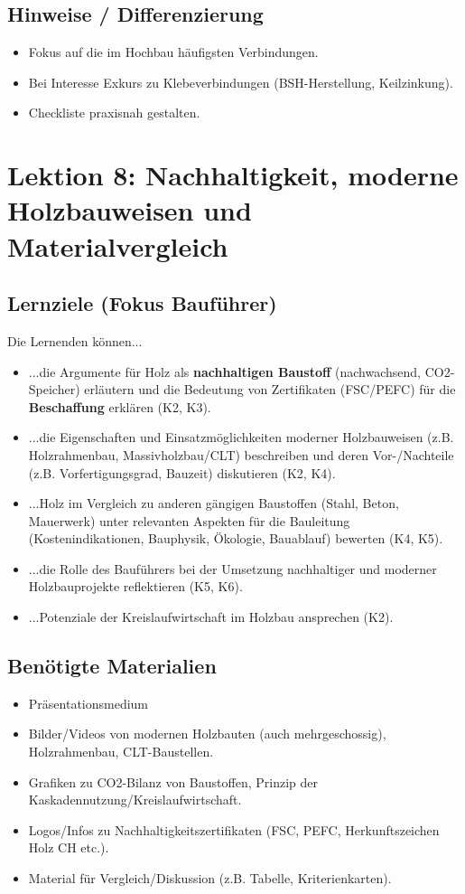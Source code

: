 \documentclass[12pt, a4paper]{article}
\begin{document}
\subsection{Hinweise / Differenzierung}
\begin{itemize}
    \item Fokus auf die im Hochbau häufigsten Verbindungen.
    \item Bei Interesse Exkurs zu Klebeverbindungen (BSH-Herstellung, Keilzinkung).
    \item Checkliste praxisnah gestalten.
\end{itemize}

\newpage

\section{Lektion 8: Nachhaltigkeit, moderne Holzbauweisen und Materialvergleich}
\subsection{Lernziele (Fokus Bauführer)}
Die Lernenden können...
\begin{itemize}
    \item ...die Argumente für Holz als \textbf{nachhaltigen Baustoff} (nachwachsend, CO2-Speicher) erläutern und die Bedeutung von Zertifikaten (FSC/PEFC) für die \textbf{Beschaffung} erklären (K2, K3).
    \item ...die Eigenschaften und Einsatzmöglichkeiten moderner Holzbauweisen (z.B. Holzrahmenbau, Massivholzbau/CLT) beschreiben und deren Vor-/Nachteile (z.B. Vorfertigungsgrad, Bauzeit) diskutieren (K2, K4).
    \item ...Holz im Vergleich zu anderen gängigen Baustoffen (Stahl, Beton, Mauerwerk) unter relevanten Aspekten für die Bauleitung (Kostenindikationen, Bauphysik, Ökologie, Bauablauf) bewerten (K4, K5).
    \item ...die Rolle des Bauführers bei der Umsetzung nachhaltiger und moderner Holzbauprojekte reflektieren (K5, K6).
    \item ...Potenziale der Kreislaufwirtschaft im Holzbau ansprechen (K2).
\end{itemize}

\subsection{Benötigte Materialien}
\begin{itemize}
    \item Präsentationsmedium
    \item Bilder/Videos von modernen Holzbauten (auch mehrgeschossig), Holzrahmenbau, CLT-Baustellen.
    \item Grafiken zu CO2-Bilanz von Baustoffen, Prinzip der Kaskadennutzung/Kreislaufwirtschaft.
    \item Logos/Infos zu Nachhaltigkeitszertifikaten (FSC, PEFC, Herkunftszeichen Holz CH etc.).
    \item Material für Vergleich/Diskussion (z.B. Tabelle, Kriterienkarten).
\end{itemize}
\end{document}

